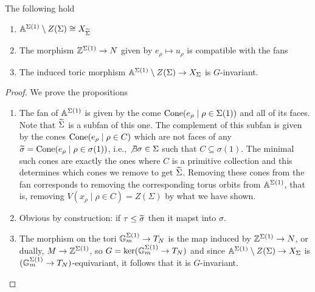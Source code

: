 \begin{proposition}[]\label{PrMakingTheTotalSpace}
The following hold
\begin{enumerate}
\item $\mathbb{A}^{\Sigma(1)}\setminus Z(\Sigma)\cong X_{\widetilde{\Sigma}}$
\item The morphism $\mathbb{Z}^{\Sigma(1)}\to N$ given by $e_\rho\mapsto u_\rho$ is compatible with the fans
\item The induced toric morphism $\mathbb{A}^{\Sigma(1)}\setminus Z(\Sigma)\to X_{\Sigma}$ is $G$-invariant.
\end{enumerate}
\end{proposition}
\begin{proof}
We prove the propositions
\setlength{\leftmargini}{0cm}
\begin{enumerate}
\item The fan of $\mathbb{A}^{\Sigma(1)}$ is given by the come $\operatorname{Cone}(e_\rho\mid \rho\in \Sigma(1))$ and all of its faces. Note that $\widetilde{\Sigma}$ is a subfan of this one. The complement of this subfan is given by the cones $\operatorname{Cone}(e_\rho\mid \rho\in C)$ which are not faces of any $\widetilde{\sigma}=\operatorname{Cone}(e_\rho\mid \rho\in \sigma(1))$, i.e., $\not\exists \sigma\in \Sigma$ such that $C\subseteq \sigma(1)$. The minimal such cones are exactly the ones where $C$ is a primitive collection and this determines which cones we remove to get $\widetilde{\Sigma}$. Removing these cones from the fan corresponds to removing the corresponding torus orbits from $\mathbb{A}^{\Sigma(1)}$, that is, removing $V(x_\rho\mid \rho\in C)=Z(\Sigma)$ by what we have shown.
\item Obvious by construction: if $\tau\leq\widetilde{\sigma}$ then it mapst into $\sigma$.
\item The morphism on the tori $\mathbb{G}_m^{\Sigma(1)}\to T_N$ is the map induced by $\mathbb{Z}^{\Sigma(1)}\to N$, or dually, $M\to \mathbb{Z}^{\Sigma(1)}$, so $G=\ker(\mathbb{G}_m^{\Sigma(1)}\to T_N)$ and since $\mathbb{A}^{\Sigma(1)}\setminus Z(\Sigma)\to X_{\Sigma}$ is $(\mathbb{G}_m^{\Sigma(1)}\to T_N)$-equivariant, it follows that it is $G$-invariant.
\end{enumerate}
\setlength{\leftmargini}{0.5cm}
\end{proof}


